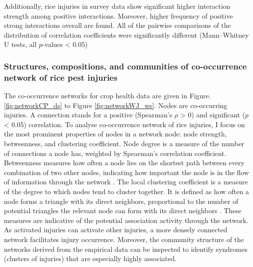Additionally, rice injuries in survey data show significant higher interaction strength among positive interactions. Moreover, higher frequency of positive strong interactions overall are found. All of the pairwise comparisons of the distribution of correlation coefficients were significantly different (Mann–Whitney U tests, all $p$-values < 0.05)

\subsubsection{Structures, compositions, and communities of co-occurrence network of rice pest injuries}

The co-occurrence networks for crop health data are given in Figure. \ref{fig:networkCP_ds} to Figure \ref{fig:networkWJ_ws}. Nodes are co-occurring injuries. A connection stands for a positive (Spearman’s $\rho$ > 0) and significant ($p$ < 0.05) correlation. To analyse co-occurrence network of rice injuries, I focus on the most prominent properties of nodes in a network node: node strength, betweenness, and clustering coefficient. Node degree is a measure of the number of connections a node has, weighted by Spearman’s correlation coefficient. Betweenness measures how often a node lies on the shortest path between every combination of two other nodes, indicating how important the node is in the flow of information through the network \citep{Opsahl_2010_Node}. The local clustering coefficient is a measure of the degree to which nodes tend to cluster together. It is defined as how often a node forms a triangle with its direct neighbors, proportional to the number of potential triangles the relevant node can form with its direct neighbors \citet{Opsahl_2010_Node}. These measures are indicative of the potential association activity through the network. As activated injuries can activate other injuries, a more densely connected network facilitates injury occurrence. Moreover, the community structure of the networks derived from the empirical data can be inspected to identify syndromes (clusters of injuries) that are especially highly associated.
%


